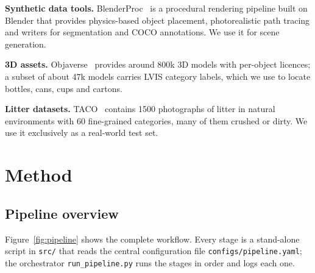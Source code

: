 \documentclass[11pt,a4paper]{article}
\newcommand{\code}[1]{\texttt{\small #1}}
\begin{document}
\textbf{Synthetic data tools.} BlenderProc~\cite{blenderproc} is a procedural rendering pipeline
built on Blender that provides physics-based object placement, photorealistic path tracing and
writers for segmentation and COCO annotations. We use it for scene generation.

\textbf{3D assets.} Objaverse~\cite{objaverse} provides around 800k 3D models with per-object
licences; a subset of about 47k models carries LVIS category labels, which we use to locate
bottles, cans, cups and cartons.

\textbf{Litter datasets.} TACO~\cite{taco} contains 1500 photographs of litter in natural
environments with 60 fine-grained categories, many of them crushed or dirty. We use it
exclusively as a real-world test set.

\section{Method}

\subsection{Pipeline overview}

Figure~\ref{fig:pipeline} shows the complete workflow. Every stage is a stand-alone script in
\code{src/} that reads the central configuration file \code{configs/pipeline.yaml}; the
orchestrator \code{run\_pipeline.py} runs the stages in order and logs each one.
\end{document}
